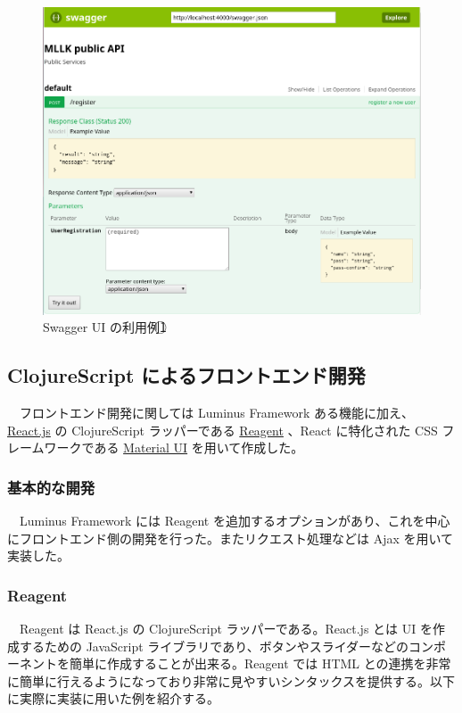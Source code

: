 \documentclass[dvipdfmx]{scrartcl}
\begin{document}
\begin{figure}[htbp]
\centering
\includegraphics[width=15cm]{./swagger-ui-view2.PNG}
\caption{Swagger UI の利用例\textcircled{\scriptsize 1}}
\end{figure}

\subsection{ClojureScript によるフロントエンド開発}
\label{sec:org94147f5}
　フロントエンド開発に関しては Luminus Framework ある機能に加え、 \href{https://reactjs.org/}{React.js} の ClojureScript ラッパーである \href{https://reagent-project.github.io/}{Reagent} 、React に特化された CSS フレームワークである \href{http://www.material-ui.com/\#/}{Material UI} を用いて作成した。\\
\subsubsection{基本的な開発}
\label{sec:org45aa267}
　Luminus Framework には Reagent を追加するオプションがあり、これを中心にフロントエンド側の開発を行った。またリクエスト処理などは Ajax を用いて実装した。\\
\subsubsection{Reagent}
\label{sec:org762a86b}
　Reagent は React.js の ClojureScript ラッパーである。React.js とは UI を作成するための JavaScript ライブラリであり、ボタンやスライダーなどのコンポーネントを簡単に作成することが出来る。Reagent では HTML との連携を非常に簡単に行えるようになっており非常に見やすいシンタックスを提供する。以下に実際に実装に用いた例を紹介する。\\
\end{document}
